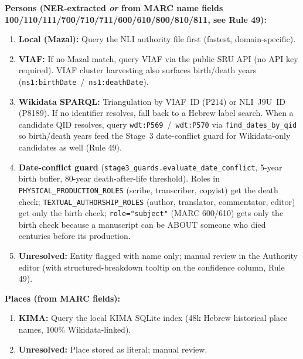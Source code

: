 \documentclass[12pt]{article}
\newcommand{\code}[1]{\texttt{#1}}
\begin{document}
\textbf{Persons (NER-extracted \emph{or} from MARC name fields 100/110/111/700/710/711/600/610/800/810/811, see Rule 49):}
\begin{enumerate}
\item \textbf{Local (Mazal):} Query the NLI authority file first (fastest, domain-specific).
\item \textbf{VIAF:} If no Mazal match, query VIAF via the public SRU API (no API key required). VIAF cluster harvesting also surfaces birth/death years (\code{ns1:birthDate}~/~\code{ns1:deathDate}).
\item \textbf{Wikidata SPARQL:} Triangulation by VIAF~ID (P214) or NLI~J9U~ID (P8189). If no identifier resolves, fall back to a Hebrew label search. When a candidate QID resolves, query \code{wdt:P569}~/~\code{wdt:P570} via \code{find\_dates\_by\_qid} so birth/death years feed the Stage~3 date-conflict guard for Wikidata-only candidates as well (Rule 49).
\item \textbf{Date-conflict guard} (\code{stage3\_guards.evaluate\_date\_conflict}, 5-year birth buffer, 80-year death-after-life threshold). Roles in \code{PHYSICAL\_PRODUCTION\_ROLES} (scribe, transcriber, copyist) get the death check; \code{TEXTUAL\_AUTHORSHIP\_ROLES} (author, translator, commentator, editor) get only the birth check; \code{role="subject"} (MARC 600/610) gets only the birth check because a manuscript can be ABOUT someone who died centuries before its production.
\item \textbf{Unresolved:} Entity flagged with name only; manual review in the Authority editor (with structured-breakdown tooltip on the confidence column, Rule 49).
\end{enumerate}

\textbf{Places (from MARC fields):}
\begin{enumerate}
\item \textbf{KIMA:} Query the local KIMA SQLite index (48k Hebrew historical place names, 100\% Wikidata-linked).
\item \textbf{Unresolved:} Place stored as literal; manual review.
\end{enumerate}
\end{document}
